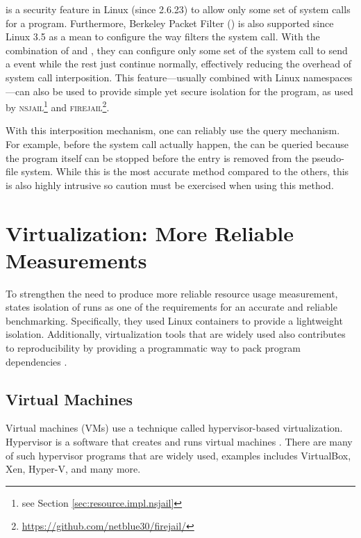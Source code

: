  is a security feature in Linux (since 2.6.23) to allow only some set of system calls for a program.
Furthermore, Berkeley Packet Filter () is also supported since Linux 3.5 as a mean to configure the way  filters the system call.
With the combination of  and , they can configure only some set of the system call to send a  event while the rest just continue normally, effectively reducing the overhead of system call interposition.
This feature---usually combined with Linux namespaces---can also be used to provide simple yet secure isolation for the program, as used by \textsc{nsjail}\footnote{see Section \ref{sec:resource.impl.nsjail}} and \textsc{firejail}\footnote{\href{https://github.com/netblue30/firejail/}{https://github.com/netblue30/firejail/}}.

With this interposition mechanism, one can reliably use the query mechanism.
For example, before the  system call actually happen, the  can be queried because the program itself can be stopped before the entry is removed from the pseudo-file system.
While this is the most accurate method compared to the others, this is also highly intrusive so caution must be exercised when using this method.

\section{Virtualization: More Reliable Measurements}

To strengthen the need to produce more reliable resource usage measurement, \citet{beyerReliableBenchmarkingRequirements2019} states isolation of runs as one of the requirements for an accurate and reliable benchmarking.
Specifically, they used Linux containers to provide a lightweight isolation.
Additionally, virtualization tools that are widely used also contributes to reproducibility by providing a programmatic way to pack program dependencies \citep{boettigerIntroductionDockerReproducible2015,kordonBenchKitToolMassive2014}.

\subsection{Virtual Machines}

Virtual machines (VMs) use a technique called hypervisor-based virtualization.
Hypervisor is a software that creates and runs virtual machines \citep{scheepersVirtualizationContainerizationApplication2014}.
There are many of such hypervisor programs that are widely used, examples includes VirtualBox, Xen, Hyper-V, and many more.

